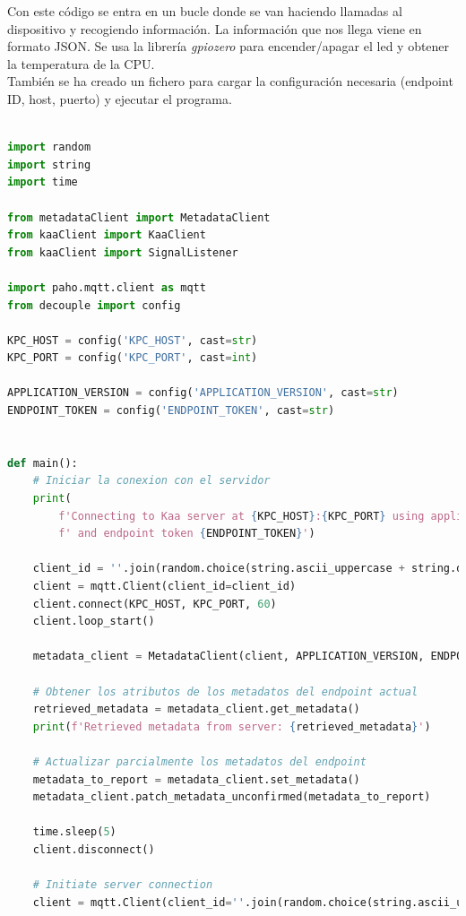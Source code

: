 {\begin{lstlisting}[language=Python]
\end{lstlisting}

Con este código se entra en un bucle donde se van haciendo llamadas al dispositivo y recogiendo información. La información que nos llega viene en formato JSON. Se usa la librería \textit{gpiozero} para encender/apagar el led y obtener la temperatura de la CPU. \\

También se ha creado un fichero para cargar la configuración necesaria (endpoint ID, host, puerto) y ejecutar el programa.

\begin{lstlisting}[language=Python]

import random
import string
import time

from metadataClient import MetadataClient
from kaaClient import KaaClient
from kaaClient import SignalListener

import paho.mqtt.client as mqtt
from decouple import config

KPC_HOST = config('KPC_HOST', cast=str)
KPC_PORT = config('KPC_PORT', cast=int)

APPLICATION_VERSION = config('APPLICATION_VERSION', cast=str)
ENDPOINT_TOKEN = config('ENDPOINT_TOKEN', cast=str)


def main():
    # Iniciar la conexion con el servidor
    print(
        f'Connecting to Kaa server at {KPC_HOST}:{KPC_PORT} using application version {APPLICATION_VERSION}'
        f' and endpoint token {ENDPOINT_TOKEN}')

    client_id = ''.join(random.choice(string.ascii_uppercase + string.digits) for _ in range(6))
    client = mqtt.Client(client_id=client_id)
    client.connect(KPC_HOST, KPC_PORT, 60)
    client.loop_start()

    metadata_client = MetadataClient(client, APPLICATION_VERSION, ENDPOINT_TOKEN)

    # Obtener los atributos de los metadatos del endpoint actual
    retrieved_metadata = metadata_client.get_metadata()
    print(f'Retrieved metadata from server: {retrieved_metadata}')

    # Actualizar parcialmente los metadatos del endpoint
    metadata_to_report = metadata_client.set_metadata()
    metadata_client.patch_metadata_unconfirmed(metadata_to_report)

    time.sleep(5)
    client.disconnect()

    # Initiate server connection
    client = mqtt.Client(client_id=''.join(random.choice(string.ascii_uppercase + string.digits) for _ in range(6)))


\end{lstlisting}}
